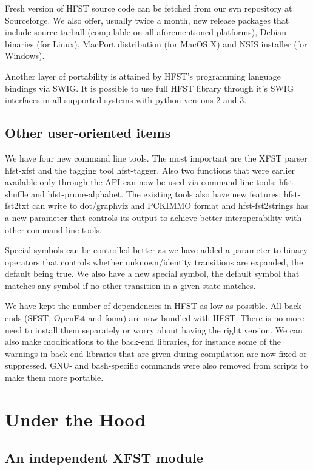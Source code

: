 \documentclass{llncs}
\begin{document}
Fresh version of HFST source code can be fetched from our svn
repository at Sourceforge. We also offer, usually twice a month, new
release packages that include source tarball (compilable on all
aforementioned platforms), Debian binaries (for Linux), MacPort
distribution (for MacOS X) and NSIS installer (for Windows).

Another layer of portability is attained by HFST's programming
language bindings via SWIG. It is possible to use full HFST library
through it's SWIG interfaces in all supported systems with python
versions 2 and 3.


\subsection{Other user-oriented items}

We have four new command line tools. The most important are the XFST
parser hfst-xfst and the tagging tool hfst-tagger. Also two functions
that were earlier available only through the API can now be used via
command line tools: hfst-shuffle and hfst-prune-alphabet. The existing
tools also have new features: hfst-fst2txt can write to dot/graphviz
and PCKIMMO format and hfst-fst2strings has a new parameter that
controls its output to achieve better interoperability with other
command line tools.

Special symbols can be controlled better as we have added a parameter
to binary operators that controls whether unknown/identity transitions
are expanded, the default being true. We also have a new special
symbol, the default symbol that matches any symbol if no other
transition in a given state matches.

We have kept the number of dependencies in HFST as low as possible.
All back-ends (SFST, OpenFst and foma) are now bundled with
HFST. There is no more need to install them separately or worry about
having the right version. We can also make modifications to the
back-end libraries, for instance some of the warnings in back-end
libraries that are given during compilation are now fixed or
suppressed. GNU- and bash-specific commands were also removed from
scripts to make them more portable.

\section{Under the Hood}

\subsection{An independent XFST module}
\end{document}
